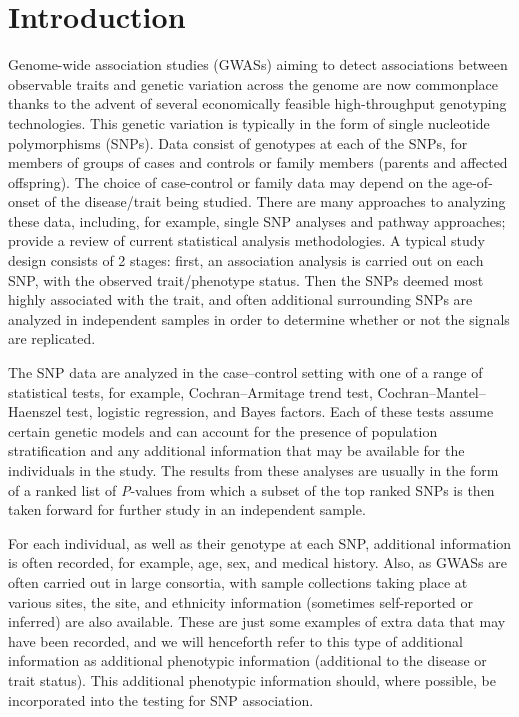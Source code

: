 \section{Introduction}
\label{sec1}

Genome-wide association studies (GWASs) aiming to detect
associations between observable traits and genetic variation
across the genome are now commonplace thanks to the advent of
several economically feasible high-throughput genotyping
technologies. This genetic variation is typically in the form of
single nucleotide polymorphisms (SNPs). Data consist of genotypes
at each of the SNPs, for members of groups of cases and controls
or family members (parents and affected offspring). The choice
of case-control or family data may depend on the age-of-onset
of the disease/trait being studied. There are many approaches to
analyzing these data, including, for example, single SNP
analyses and pathway approaches;
\citet{allison2006}
provide a review of current statistical analysis methodologies.
A typical study design consists of 2 stages: first, an association
analysis is carried out on each SNP, with the observed trait/phenotype
status. Then the SNPs deemed most highly associated with the trait,
and often additional surrounding SNPs are analyzed in independent
samples in order to determine whether or not the signals are
replicated.

The SNP data are analyzed in the case--control setting with one of a
range of statistical tests, for example, Cochran--Armitage trend
test, Cochran--Mantel--Haenszel test, logistic regression, and
Bayes factors. Each of these tests assume certain genetic models
and can account for the presence of population stratification and
any additional information that may be available for the individuals
in the study. The results from these analyses are usually in the
form of a ranked list of \textit{P}-values from which a subset of
the top ranked SNPs is then taken forward for further study in an
independent sample.

For each individual, as well as their genotype at each SNP,
additional information is often recorded, for example, age, sex,
and medical history. Also, as GWASs are often carried out
in large consortia, with sample collections taking place at
various sites, the site, and ethnicity information (sometimes
self-reported or inferred) are also available. These are just some
examples of extra data that may have been recorded, and we will
henceforth refer to this type of additional information as
additional phenotypic information (additional to the disease or
trait status). This additional phenotypic information should,
where possible, be incorporated into the testing for SNP
association.

